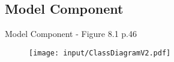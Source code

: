 \subsection{Model Component}
\begin{frame}{Model Component - Figure 8.1 p.46}
	
	\begin{figure}[p]%
	\texttt{[image: input/ClassDiagramV2.pdf]}%
	\end{figure}
	
\end{frame}
